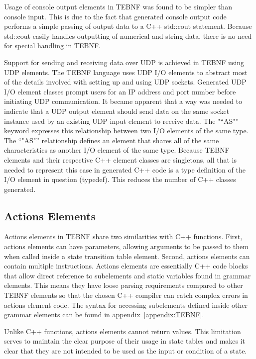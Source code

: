 \indent
Usage of console output elements in TEBNF was found to be simpler than console input.  This is due to the fact that generated console output code performs a simple passing of output data to a C++ std::cout statement.   Because std::cout easily handles outputting of numerical and string data, there is no need for special handling in TEBNF.

\indent
Support for sending and receiving data over UDP is achieved in TEBNF using UDP elements.  The TEBNF language uses UDP I/O elements to abstract most of the details involved with setting up and using UDP sockets.  Generated UDP I/O element classes prompt users for an IP address and port number before initiating UDP communication.  It became apparent that a way was needed to indicate that a UDP output element should send data on the same socket instance used by an existing UDP input element to receive data.  The "“AS"” keyword expresses this relationship between two I/O elements of the same type.  The “"AS"” relationship defines an element that shares all of the same characteristics as another I/O element of the same type.  Because TEBNF elements and their respective C++ element classes are singletons, all that is needed to represent this case in generated C++ code is a type definition of the I/O element in question (typedef).  This reduces the number of C++ classes generated.

\subsection{Actions Elements} \label{ssec:ActionsElements}
Actions elements in TEBNF share two similarities with C++ functions. First, actions elements can have parameters, allowing arguments to be passed to them when called inside a state transition table element.  Second, actions elements can contain multiple instructions.  Actions elements are essentially C++ code blocks that allow direct reference to subelements and static variables found in grammar elements.  This means they have loose parsing requirements compared to other TEBNF elements so that the chosen C++ compiler can catch complex errors in actions element code.  The syntax for accessing subelements defined inside other grammar elements can be found in appendix~\ref{appendix:TEBNF}.

\indent
Unlike C++ functions, actions elements cannot return values.  This limitation serves to maintain the clear purpose of their usage in state tables and makes it clear that they are not intended to be used as the input or condition of a state.

